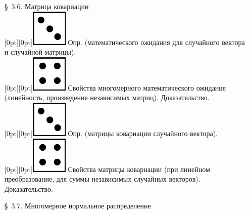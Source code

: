 \documentclass[10pt]{amsart}
\begin{document}
\begin{enumerate}
\begin{enumerate}
\item[\S\, 3.6.] Матрица ковариации \\
 \raisebox{-1pt}[0pt][0pt]{\includegraphics[width=0.02\linewidth]{3.png}} Опр. (математического ожидания для случайного вектора и случайной матрицы). \\
 \raisebox{-1pt}[0pt][0pt]{\includegraphics[width=0.02\linewidth]{4.png}} Свойства многомерного математического ожидания (линейность, произведение независимых матриц). Доказательство. \\ 
 \raisebox{-1pt}[0pt][0pt]{\includegraphics[width=0.02\linewidth]{3.png}} Опр. (матрицы ковариации случайного вектора). \\
 \raisebox{-1pt}[0pt][0pt]{\includegraphics[width=0.02\linewidth]{4.png}} Свойства матрицы ковариации (при линейном преобразование, для суммы независимых случайных векторов). Доказательство. \\


\item[\S\, 3.7.] Многомерное нормальное распределение \\


\end{enumerate}
\end{enumerate}
\end{document}
